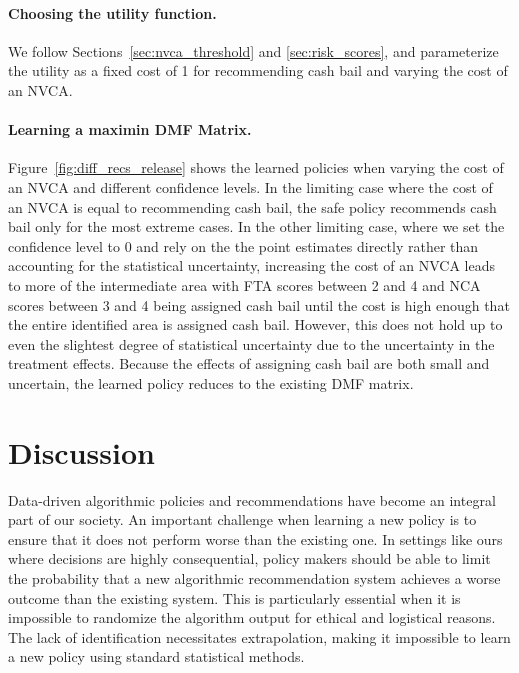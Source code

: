 \documentclass[12pt]{article}
\theoremstyle{definition}
\newcommand{\<}{\langle}
\renewcommand{\>}{\rangle}
\begin{document}
\paragraph{Choosing the utility function.}
We follow
Sections~\ref{sec:nvca_threshold} and \ref{sec:risk_scores}, and
parameterize the utility as a fixed cost of 1 for
recommending cash bail  and varying the cost of an NVCA.

\paragraph{Learning a maximin DMF Matrix.}
Figure~\ref{fig:diff_recs_release} shows the learned policies when
varying the cost of an NVCA and different confidence levels. In the
limiting case where the cost of an NVCA is equal to recommending cash
bail, the safe policy recommends cash bail only for the most
extreme cases.
In the other limiting case, where we set the confidence level to 0 and
rely on the the point estimates directly rather than accounting for
the statistical uncertainty,
increasing the cost of an NVCA
leads to more of the
intermediate area with FTA scores between 2 and 4 and NCA scores
between 3 and 4 being assigned cash bail until the cost is high enough
that the entire identified area is assigned cash bail. However, this
does not hold up to even the slightest degree of statistical uncertainty due
to the uncertainty in the treatment effects. Because the effects of
assigning cash bail are both small and uncertain, the learned policy
reduces to the existing DMF matrix.



\section{Discussion}
\label{sec:discussion}

Data-driven algorithmic policies and recommendations
have become an integral part of our society.  An important challenge
when learning a new policy is to
ensure that it does not perform worse than the existing one.  In
settings like ours where decisions are highly consequential,
policy makers should be able to limit the probability
that a new algorithmic recommendation system achieves a worse outcome than
the existing system.
This is particularly essential when it is impossible to randomize the
algorithm output for ethical and logistical reasons. The lack of
identification necessitates extrapolation, making it
impossible to learn a new policy using standard statistical methods.
\end{document}
